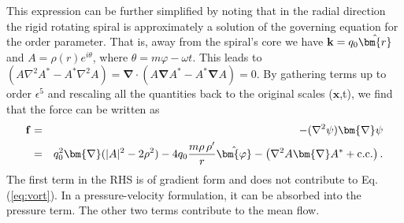 \documentclass[preprint,prx,floatfix]{revtex4-1}
\begin{document}
This expression can be further simplified by noting that in the radial direction the rigid rotating spiral is approximately a solution of the governing equation for the order parameter. That is, away from the spiral's core we have ${\bf k} = q_0 \hat{\bm{r}}$ and $A = \rho(r)e^{i\theta}$, where $\theta = m\varphi - \omega t $. This leads to 
 $ ( A \nabla^{2} A^{*} - A^{*} \nabla^{2} A ) = \bm{\nabla}\cdot(A\bm{\nabla} A^* - A^*\bm{\nabla} A) = 0$.
By gathering terms up to order $\epsilon^5$ and rescaling all the quantities back to the original scales ($\mathbf{x}$,t), we find that the force can be written as
\begin{eqnarray}
\nonumber
  \mathbf{f}
  &=& - (\nabla^{2} \psi) \bm{\nabla} \psi 
  \\
  &=&
      q_0^{2} \bm{\nabla} (|A|^{2} - 2 \rho^2)
     - 4 q_0 \frac{m \rho\,\rho'}{r} \hat{\bm{\varphi}}
     - \left( \nabla^{2}A \bm{\nabla} A^{*} + {\rm c.c.} \right).
     \label{eq:sh_f}
\end{eqnarray}
The first term in the RHS is of gradient form and does not contribute to Eq. (\ref{eq:vort}). In a pressure-velocity formulation, it can be absorbed into the pressure term. The other two terms contribute to the mean flow. 
\end{document}
